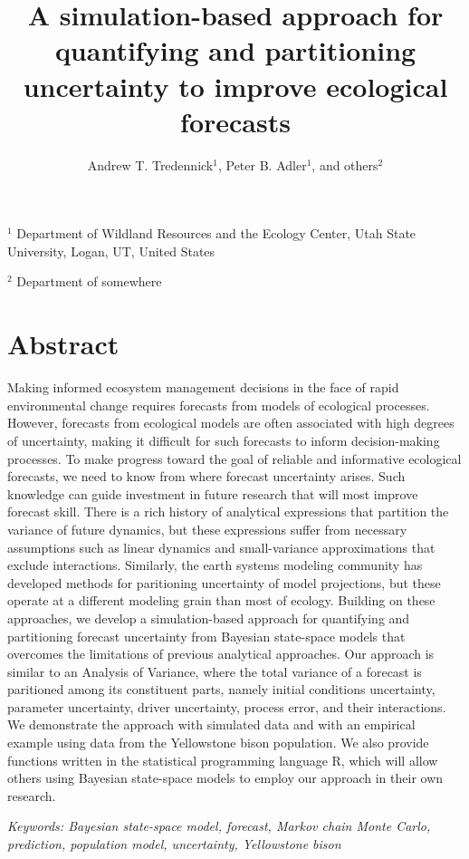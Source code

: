 \documentclass[12pt,]{article}
\title{A simulation-based approach for quantifying and partitioning uncertainty
to improve ecological forecasts}
\author{Andrew T. Tredennick\(^{1}\), Peter B. Adler\(^1\), and others\(^{2}\)}
\date{}
\begin{document}
\maketitle

\setlength{\abovedisplayskip}{0pt}\raggedright

\(^1\) Department of Wildland Resources and the Ecology Center, Utah
State University, Logan, UT, United States

\(^2\) Department of somewhere

\hypertarget{abstract}{%
\section{Abstract}\label{abstract}}

Making informed ecosystem management decisions in the face of rapid
environmental change requires forecasts from models of ecological
processes. However, forecasts from ecological models are often
associated with high degrees of uncertainty, making it difficult for
such forecasts to inform decision-making processes. To make progress
toward the goal of reliable and informative ecological forecasts, we
need to know from where forecast uncertainty arises. Such knowledge can
guide investment in future research that will most improve forecast
skill. There is a rich history of analytical expressions that partition
the variance of future dynamics, but these expressions suffer from
necessary assumptions such as linear dynamics and small-variance
approximations that exclude interactions. Similarly, the earth systems
modeling community has developed methods for paritioning uncertainty of
model projections, but these operate at a different modeling grain than
most of ecology. Building on these approaches, we develop a
simulation-based approach for quantifying and partitioning forecast
uncertainty from Bayesian state-space models that overcomes the
limitations of previous analytical approaches. Our approach is similar
to an Analysis of Variance, where the total variance of a forecast is
paritioned among its constituent parts, namely initial conditions
uncertainty, parameter uncertainty, driver uncertainty, process error,
and their interactions. We demonstrate the approach with simulated data
and with an empirical example using data from the Yellowstone bison
population. We also provide functions written in the statistical
programming language R, which will allow others using Bayesian
state-space models to employ our approach in their own research.

\emph{Keywords: Bayesian state-space model, forecast, Markov chain Monte
Carlo, prediction, population model, uncertainty, Yellowstone bison}
\end{document}
